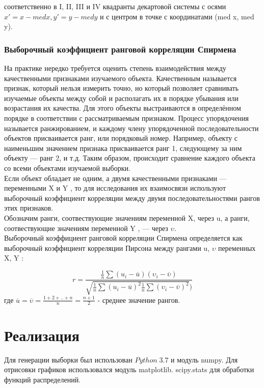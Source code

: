 \documentclass[a4]{article}
\begin{document}
	соответственно в I, II, III и IV квадранты декартовой системы с осями $x' = x - med x, y' = y - med y$ и с центром в точке с координатами (med x, med y).
					
					\subsubsection{Выборочный коэффициент ранговой корреляции Спирмена}
						На практике нередко требуется оценить степень взаимодействия между качественными признаками изучаемого объекта. Качественным называется признак, который нельзя измерить точно, но который позволяет сравнивать изучаемые объекты между собой и располагать их в порядке убывания или возрастания их качества. Для этого объекты выстраиваются в определённом порядке в соответствии с рассматриваемым признаком. Процесс упорядочения называется ранжированием, и каждому члену упорядоченной последовательности объектов присваивается ранг, или порядковый номер. Например, объекту с наименьшим значением признака присваивается ранг 1, следующему за ним объекту — ранг 2, и т.д. Таким образом, происходит сравнение каждого объекта со всеми объектами изучаемой выборки.\\
						
						Если объект обладает не одним, а двумя качественными признаками — переменными X и Y , то для исследования их взаимосвязи используют выборочный коэффициент корреляции между двумя последовательностями рангов этих признаков.\\
						Обозначим ранги, соотвествующие значениям переменной X, через u, а ранги, соотвествующие значениям переменной Y , — через $\upsilon$.\\
						Выборочный коэффициент ранговой корреляции Спирмена определяется как выборочный коэффициент корреляции Пирсона между рангами u, $\upsilon$ переменных X, Y :
						
						$$r = \frac{\frac{1}{n} \sum(u_i - \overline{u})(\upsilon_i - \overline{\upsilon})}{\sqrt{\frac{1}{n} \sum (u_i - \overline{u})^2 \frac{1}{n} \sum(\upsilon_i - \overline{\upsilon})^2})}$$
						где $\overline{u} = \overline{\upsilon} = \frac{1 + 2 + .. + n}{n} = \frac{n + 1}{2}$ - среднее значение рангов.
	\section{Реализация}
	Для генерации выборки был использован $Python\;3.7$ и модуль numpy. Для отрисовки графиков использовался модуль matplotlib. scipy.stats для обработки функций распределений.
\end{document}
